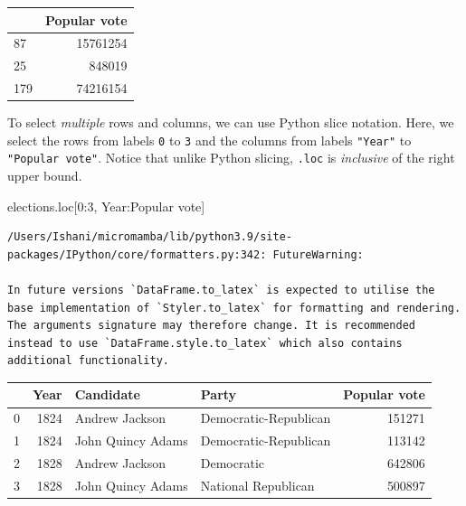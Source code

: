 \documentclass[
  letterpaper,
  DIV=11,
  numbers=noendperiod]{scrreprt}
\newenvironment{Shaded}{\begin{snugshade}}{\end{snugshade}}
\newcommand{\DecValTok}[1]{\textcolor[rgb]{0.68,0.00,0.00}{#1}}
\newcommand{\NormalTok}[1]{\textcolor[rgb]{0.00,0.23,0.31}{#1}}
\newcommand{\StringTok}[1]{\textcolor[rgb]{0.13,0.47,0.30}{#1}}
\begin{document}
\begin{tabular}{lr}
\toprule
{} &  Popular vote \\
\midrule
87  &      15761254 \\
25  &        848019 \\
179 &      74216154 \\
\bottomrule
\end{tabular}

To select \emph{multiple} rows and columns, we can use Python slice
notation. Here, we select the rows from labels \texttt{0} to \texttt{3}
and the columns from labels \texttt{"Year"} to \texttt{"Popular\ vote"}.
Notice that unlike Python slicing, \texttt{.loc} is \emph{inclusive} of
the right upper bound.

\begin{Shaded}
\begin{Highlighting}[]
\NormalTok{elections.loc[}\DecValTok{0}\NormalTok{:}\DecValTok{3}\NormalTok{, }\StringTok{\textquotesingle{}Year\textquotesingle{}}\NormalTok{:}\StringTok{\textquotesingle{}Popular vote\textquotesingle{}}\NormalTok{]}
\end{Highlighting}
\end{Shaded}

\begin{verbatim}
/Users/Ishani/micromamba/lib/python3.9/site-packages/IPython/core/formatters.py:342: FutureWarning:

In future versions `DataFrame.to_latex` is expected to utilise the base implementation of `Styler.to_latex` for formatting and rendering. The arguments signature may therefore change. It is recommended instead to use `DataFrame.style.to_latex` which also contains additional functionality.
\end{verbatim}

\begin{tabular}{lrllr}
\toprule
{} &  Year &          Candidate &                  Party &  Popular vote \\
\midrule
0 &  1824 &     Andrew Jackson &  Democratic-Republican &        151271 \\
1 &  1824 &  John Quincy Adams &  Democratic-Republican &        113142 \\
2 &  1828 &     Andrew Jackson &             Democratic &        642806 \\
3 &  1828 &  John Quincy Adams &    National Republican &        500897 \\
\bottomrule
\end{tabular}
\end{document}
